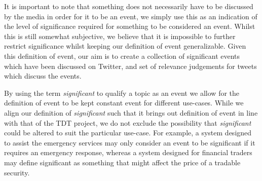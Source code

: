 It is important to note that something does not necessarily have to be discussed by the media in order for it to be an event, we simply use this as an indication of the level of significance required for something to be considered an event.
Whilst this is still somewhat subjective, we believe that it is impossible to further restrict significance whilst keeping our definition of event generalizable.
Given this definition of event, our aim is to create a collection of significant events which have been discussed on Twitter, and set of relevance judgements for tweets which discuss the events.

By using the term \emph{significant} to qualify a topic as an event we allow for the definition of event to be kept constant event for different use-cases.
While we align our definition of \emph{significant} such that it brings out definition of event in line with that of the TDT project, we do not exclude the possibility that \emph{significant} could be altered to suit the particular use-case.
For example, a system designed to assist the emergency services may only consider an event to be significant if it requires an emergency response, whereas a system designed for financial traders may define significant as something that might affect the price of a tradable security.